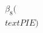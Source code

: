 \documentclass[preview]{standalone}
\begin{document}
\begin{align*}
\beta_8(\\text{PIE})
\end{align*}
\end{document}
